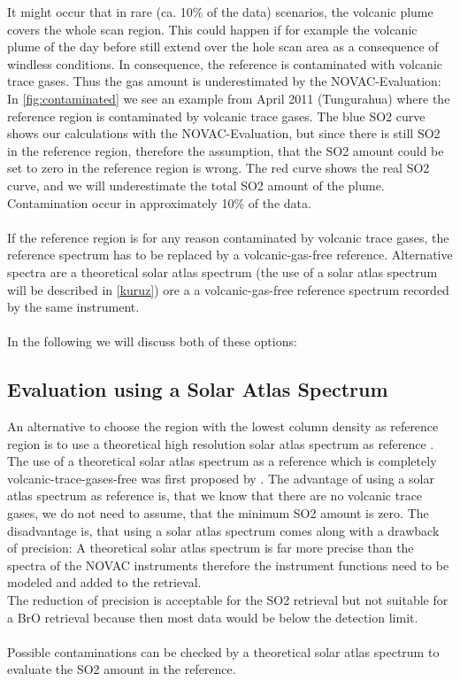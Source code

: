\documentclass  [
  paper    = a4,
  BCOR     = 10mm,
  twoside,
  fontsize = 12pt,
  fleqn,
  toc      = bibnumbered,
  toc      = listofnumbered,
  numbers  = noendperiod,
  headings = normal,
  listof   = leveldown,
  version  = 3.03
]                                       {scrreprt}
\begin{document}
	It might occur that in rare (ca. 10\% of the data) scenarios, the
	volcanic plume covers the whole scan region.
	This could happen if for example the volcanic plume of the day before still extend over the hole scan area as a consequence of windless conditions.
	In consequence, the reference	is contaminated with volcanic trace gases. Thus the gas amount is underestimated by the NOVAC-Evaluation: In \cref{fig:contaminated} we see an example from April 2011 (Tungurahua) where the reference region is contaminated by volcanic trace gases. The blue SO2 curve shows our calculations with the NOVAC-Evaluation, but since there is still SO2 in the reference region, therefore the assumption, that the SO2 amount could be set to zero in the reference region is wrong. The red curve shows the real SO2 curve, and we will underestimate the total SO2 amount of the plume. Contamination occur in approximately 10$\%$ of the data.\\
	\\
	If the reference region is for any reason
	contaminated by volcanic trace gases, the reference spectrum has to be
	replaced by a volcanic-gas-free reference. Alternative spectra are a
	theoretical solar atlas spectrum (the use of a solar atlas spectrum will be described in \cref{kuruz}) ore a a volcanic-gas-free reference
	spectrum recorded by the same instrument.\\ 
	\\
	In the following we will discuss both of these options:
	\subsection*{Evaluation using a Solar Atlas Spectrum \label{kuruz}}
	An alternative to choose the region with the lowest column density as reference region is to use a theoretical high resolution solar atlas spectrum as reference \cite{chance2010improved}.
	The use of a theoretical solar atlas spectrum as a reference which is completely volcanic-trace-gases-free was first proposed by \cite{lubcke2014bro}.
	The advantage of using a solar atlas spectrum as reference is, that we know that there are no volcanic trace gases, we do not need to assume, that the minimum SO2 amount is zero. The disadvantage is, that using a solar atlas spectrum comes along with a drawback of precision: A theoretical solar atlas spectrum is far more precise than the spectra of the NOVAC instruments therefore the instrument functions need to be modeled and added to the retrieval.\\ 
	The reduction of precision is acceptable for the
	SO2 retrieval but not suitable for a BrO retrieval because then most data would be below the detection limit.\\
%
\\
%
	Possible contaminations can be checked
	by a theoretical solar atlas spectrum to evaluate the SO2 amount in the reference.
\end{document}
